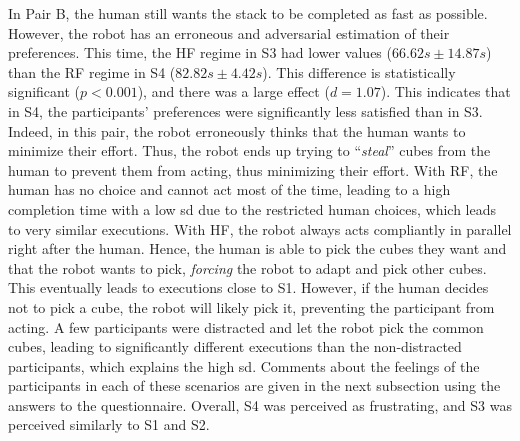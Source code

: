 In Pair B, the human still wants the stack to be completed as fast as possible. However, the robot has an erroneous and adversarial estimation of their preferences. This time, the HF regime in S3 had lower values ($66.62s \pm 14.87s$) than the RF regime in S4 ($82.82s \pm 4.42s$). This difference is statistically significant ($p < 0.001$), and there was a large effect ($d = 1.07$). This indicates that in S4, the participants' preferences were significantly less satisfied than in S3. 
Indeed, in this pair, the robot erroneously thinks that the human wants to minimize their effort. Thus, the robot ends up trying to ``\textit{steal}'' cubes from the human to prevent them from acting, thus minimizing their effort. With RF, the human has no choice and cannot act most of the time, leading to a high completion time with a low \acrshort{sd} due to the restricted human choices, which leads to very similar executions. With HF, the robot always acts compliantly in parallel right after the human. Hence, the human is able to pick the cubes they want and that the robot wants to pick, \textit{forcing} the robot to adapt and pick other cubes. This eventually leads to executions close to S1. However, if the human decides not to pick a cube, the robot will likely pick it, preventing the participant from acting. A few participants were distracted and let the robot pick the common cubes, leading to significantly different executions than the non-distracted participants, which explains the high \acrshort{sd}. Comments about the feelings of the participants in each of these scenarios are given in the next subsection using the answers to the questionnaire. Overall, S4 was perceived as frustrating, and S3 was perceived similarly to S1 and S2. 

